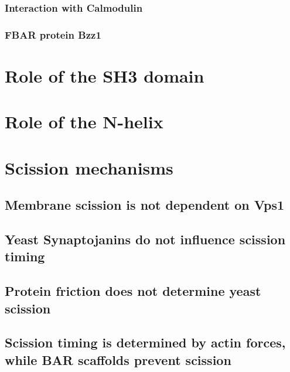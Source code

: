 			\subsubsection{Interaction with Calmodulin}
			\subsubsection{FBAR protein Bzz1}
				
\section{Role of the SH3 domain}		
\section{Role of the N-helix}			
		
\section{Scission mechanisms}

	\subsection{Membrane scission is not dependent on Vps1}
	\subsection{Yeast Synaptojanins do not influence scission timing}
	\subsection{Protein friction does not determine yeast scission }
	\subsection{Scission timing is determined by actin forces, while BAR scaffolds prevent scission}